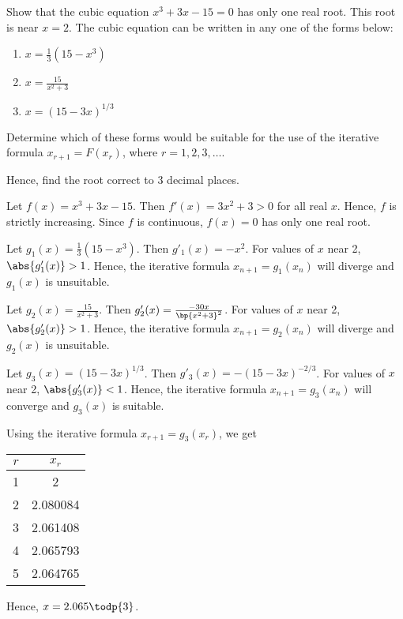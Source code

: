 \begin{problem}
    Show that the cubic equation $x^3 + 3x - 15 = 0$ has only one real root. This root is near $x=2$. The cubic equation can be written in any one of the forms below:
    \begin{enumerate}
        \item $x = \frac13 (15-x^3)$
        \item $x = \frac{15}{x^2 + 3}$
        \item $x = (15-3x)^{1/3}$
    \end{enumerate}

    Determine which of these forms would be suitable for the use of the iterative formula $x_{r+1} = F(x_r)$, where $r = 1, 2, 3, \ldots$.

    Hence, find the root correct to 3 decimal places.
\end{problem}
\begin{solution}
    Let $f(x) = x^3 + 3x - 15$. Then $f'(x) = 3x^2 + 3 > 0$ for all real $x$. Hence, $f$ is strictly increasing. Since $f$ is continuous, $f(x) = 0$ has only one real root.

    \begin{ppart}
        Let $g_1(x) = \frac13 (15-x^3)$. Then $g'_1(x) = -x^2$. For values of $x$ near 2, $\abs{g'_1(x)} > 1$. Hence, the iterative formula $x_{n+1} = g_1(x_n)$ will diverge and $g_1(x)$ is unsuitable.
    \end{ppart}

    \begin{ppart}
        Let $g_2(x) = \frac{15}{x^2 + 3}$. Then $g'_2(x) = \frac{-30x}{\bp{x^2 + 3}^2}$. For values of $x$ near 2, $\abs{g'_2(x)} > 1$. Hence, the iterative formula $x_{n+1} = g_2(x_n)$ will diverge and $g_2(x)$ is unsuitable.
    \end{ppart}
    
    \begin{ppart}
        Let $g_3(x) = (15-3x)^{1/3}$. Then $g'_3(x) = -(15-3x)^{-2/3}$. For values of $x$ near 2, $\abs{g'_3(x)} < 1$. Hence, the iterative formula $x_{n+1} = g_3(x_n)$ will converge and $g_3(x)$ is suitable.

        Using the iterative formula $x_{r+1} = g_3(x_r)$, we get
        \begin{table}[H]
            \centering
            \begin{tabular}{|c|c|}
            \hline
            $r$ & $x_r$ \\ \hline
            1 & 2 \\ \hline
            2 & 2.080084 \\ \hline
            3 & 2.061408 \\ \hline
            4 & 2.065793 \\ \hline
            5 & 2.064765 \\ \hline
            \end{tabular}
        \end{table}
        Hence, $x = 2.065 \todp{3}$.
    \end{ppart}
\end{solution}

